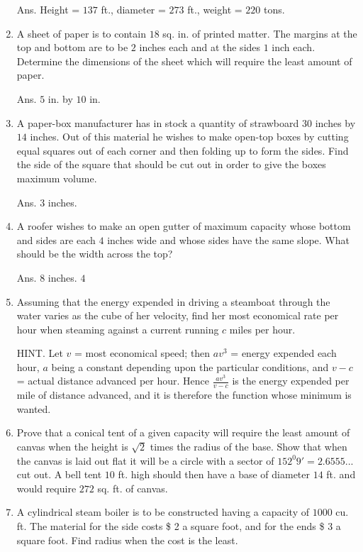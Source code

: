 \begin{enumerate}
Ans. Height = $137$ ft., diameter = $273$ ft., weight = $220$ tons.

\item
A sheet of paper is to contain $18$ sq. in. of printed matter. 
The margins at the top and bottom are to be $2$ inches each and 
at the sides $1$ inch each. Determine the dimensions of the 
sheet which will require the least amount of paper.

Ans. $5$ in. by $10$ in.

\item
A paper-box manufacturer has in stock a quantity of 
strawboard $30$ inches by $14$ inches. Out of this material he 
wishes to make open-top boxes by cutting equal squares out of each 
corner and then folding up to form the sides. Find the side of 
the square that should be cut out in order to give the 
boxes maximum volume.

Ans. $3$ inches.

\item
A roofer wishes to make an open gutter of maximum capacity whose 
bottom and sides are each $4$ inches wide and whose sides have the 
same slope. What should be the width across the top?

Ans. $8$ inches. $4$

\item
Assuming that the energy expended in driving a steamboat through 
the water varies as the cube of her velocity, find her most economical 
rate per hour when steaming against a current running $c$ miles per hour.

HINT. Let 	$v$ 	= most economical speed;
then 	$av^3$ 	= energy expended each hour, $a$ being a 
constant depending upon the particular conditions,
and 	$v - c$	= actual distance advanced per hour.
Hence $\frac{av^3}{v - c}$ is the energy expended per mile of 
distance advanced, and it is therefore the function whose minimum is wanted.

\item
Prove that a conical tent of a given capacity will require 
the least amount of canvas when the height is $\sqrt{2}$ times the 
radius of the base. Show that when the canvas is laid out flat it 
will be a circle with a sector of $152^0 9'= 2.6555... $ cut out. 
A bell tent $10$ ft. high should then have a base of diameter $14$ ft. 
and would require $272$ sq. ft. of canvas.

\item
A cylindrical steam boiler is to be constructed having a capacity of 
$1000$ cu. ft. The material for the side costs \$ 2 a square foot, 
and for the ends \$ 3 a square foot. Find radius when the cost is the least.


\end{enumerate}
